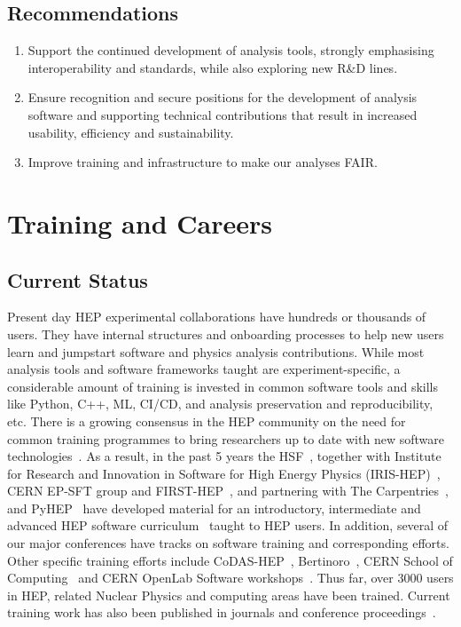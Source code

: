 \documentclass[10pt,a4paper]{article}
\begin{document}
\subsection{Recommendations}\label{recommendations-3}

\begin{enumerate}
\def\labelenumi{\arabic{enumi}.}
\item
  Support the continued development of analysis tools, strongly
  emphasising interoperability and standards, while also exploring new
  R\&D lines.
\item
  Ensure recognition and secure positions for the development of
  analysis software and supporting technical contributions that
  result in increased usability, efficiency and sustainability.
\item
  Improve training and infrastructure to make our analyses FAIR.
\end{enumerate}

\section{Training and Careers}\label{training-and-careers}

\subsection{Current Status}\label{current-status}

Present day HEP experimental collaborations have hundreds or thousands of users.
They have internal structures and onboarding processes to help new users learn
and jumpstart software and physics analysis contributions. While most analysis
tools and software frameworks taught are experiment-specific, a considerable
amount of training is invested in common software tools and skills like Python,
C++, ML, CI/CD, and analysis preservation and reproducibility, etc. There is a
growing consensus in the HEP community on the need for common training programmes
to bring researchers up to date with new software
technologies~\cite{HSF-CWP-2017-02, Snowmass:2021_community_engagement_frontier, Snowmass:2021_CEF_report, Snowmass:2021_career_pipeline}.
As a result, in the past 5 years the HSF~\cite{HSFTraining}, together with Institute for
Research and Innovation in Software for High Energy Physics (IRIS-HEP)~\cite{IRISHEP:Training},
CERN EP-SFT group and FIRST-HEP~\cite{FIRST-HEP}, and partnering with The
Carpentries~\cite{TheCarpentries}, and PyHEP~\cite{HSFPyHEP} have developed material for an
introductory, intermediate and advanced HEP software curriculum~\cite{HSFTrainingCenter} taught
to HEP users. In addition, several of our major conferences have tracks on
software training and corresponding efforts. Other specific training efforts
include CoDAS-HEP~\cite{CODAS-HEP}, Bertinoro~\cite{INFN:ESC_school}, CERN School of
Computing~\cite{CERN:computing_school} and CERN OpenLab Software
workshops~\cite{CERN:SW_workshops}. Thus far,
over 3000 users in HEP, related Nuclear Physics and computing areas have been
trained. Current training work has also been published in journals and
conference proceedings~\cite{Malik:2919564, Malik:chep2023_training_outreach, Malik2021Software, 10.3389/fdata.2025.1497622}.
\end{document}
